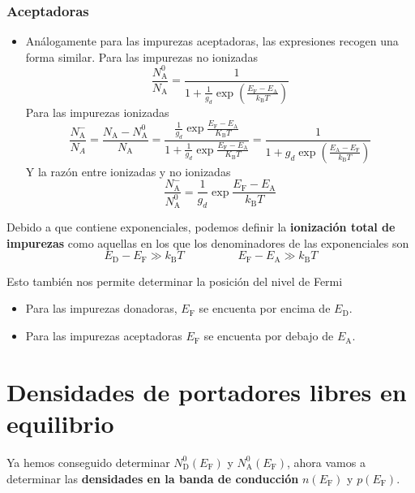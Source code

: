 \subsubsection{Aceptadoras} \label{sec: Aceptadoras}
\begin{itemize}
    \item Análogamente para las impurezas aceptadoras, las expresiones recogen una forma similar.
    Para las impurezas no ionizadas
    \begin{equation}
        \frac{N_\mathrm{A}^0}{N_\mathrm{A}}=\frac{1}{1+\frac{1}{g_d}\exp\left( \frac{E_\mathrm{F}-E_\mathrm{A}}{k_\mathrm{B}T}\right)}
        \label{eq: probabilidad no ionizadas A}
    \end{equation}
    Para las impurezas ionizadas
    \begin{equation}
           \frac{N_\mathrm{A}^{-}}{N_A}=\frac{N_\mathrm{A}-N_\mathrm{A}^0}{N_\mathrm{A}}=\frac{\frac{1}{g_d} \exp \frac{E_\mathrm{F}-E_\mathrm{A}}{K_\mathrm{B} T}}{1+\frac{1}{g_d} \exp \frac{E_\mathrm{F}-E_\mathrm{A}}{K_\mathrm{B} T}}=\frac{1}{1+g_d\exp{\left( \frac{E_\mathrm{A}-E_\mathrm{F}}{k_\mathrm{B}T}\right)}}
          \label{eq: probabiliad ionizadas A}
    \end{equation}
    Y la razón entre ionizadas y no ionizadas
    \begin{equation}
        \frac{N_\mathrm{A}^-}{N_\mathrm{A}^0}=\frac{1}{g_d} \exp\frac{E_\mathrm{F}-E_\mathrm{A}}{k_\mathrm{B}T}
        \label{eq: Razon N-N0}
    \end{equation}
\end{itemize}
Debido a que contiene exponenciales, podemos definir la \textbf{ionización total de impurezas} como aquellas en los que los denominadores de las exponenciales son  $$E_\mathrm{D}-E_\mathrm{F}\gg k_\mathrm{B}T \hspace{2cm} E_\mathrm{F}-E_\mathrm{A}\gg k_\mathrm{B}T$$
\clearpage



Esto también nos permite determinar la posición del nivel de Fermi
\begin{itemize}
    \item Para las impurezas donadoras, $E_\mathrm{F}$ se encuenta por encima de $E_\mathrm{D}$.
    \item Para las impurezas aceptadoras $E_\mathrm{F}$ se encuenta por debajo de $E_\mathrm{A}$.
\end{itemize}
\section{Densidades de portadores libres en equilibrio} \label{sec: Densidaddes de portadores en equilibrio}
Ya hemos conseguido determinar $N_\mathrm{D}^0(E_\mathrm{F})$ y $N_\mathrm{A}^0(E_\mathrm{F})$, ahora vamos a determinar las \textbf{densidades en la banda de conducción} $n(E_\mathrm{F})$ y $p(E_\mathrm{F})$.
